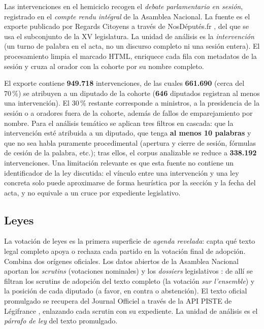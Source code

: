 Las intervenciones en el hemiciclo recogen el \emph{debate parlamentario en
sesión}, registrado en el \emph{compte rendu intégral} de la Asamblea Nacional.
La fuente es el exporte publicado por Regards Citoyens a través de NosDéputés.fr
\cite{regardscitoyens_nosdeputes}, del que se usa el subconjunto de la XV
legislatura. La unidad de análisis es la \emph{intervención} (un turno de
palabra en el acta, no un discurso completo ni una sesión entera). El
procesamiento limpia el marcado HTML, enriquece cada fila con metadatos de la
sesión y cruza al orador con la cohorte por su nombre completo.

El exporte contiene \textbf{949.718} intervenciones, de las cuales
\textbf{661.690} (cerca del $70\,\%$) se atribuyen a un diputado de la cohorte
(\textbf{646} diputados registran al menos una intervención). El $30\,\%$
restante corresponde a ministros, a la presidencia de la sesión o a oradores
fuera de la cohorte, además de fallos de emparejamiento por nombre. Para el
análisis temático se aplican tres filtros en cascada: que la intervención esté
atribuida a un diputado, que tenga \textbf{al menos 10 palabras} y que no sea
habla puramente procedimental (apertura y cierre de sesión, fórmulas de cesión de
la palabra, etc.); tras ellos, el corpus analizable se reduce a \textbf{338.192}
intervenciones. Una limitación relevante es que esta fuente no contiene un
identificador de la ley discutida: el vínculo entre una intervención y una ley
concreta solo puede aproximarse de forma heurística por la sección y la fecha del
acta, y no equivale a un cruce por expediente legislativo.

\subsection{Leyes}
\label{sec:corpus-leyes}

La votación de leyes es la primera superficie de \emph{agenda revelada}: capta
qué texto legal completo apoya o rechaza cada partido en la votación final de
adopción. Combina dos orígenes oficiales. Los datos abiertos de la Asamblea
Nacional aportan los \emph{scrutins} (votaciones nominales) y los \emph{dossiers}
legislativos \cite{an_opendata_xv}: de allí se filtran los scrutins de adopción
del texto completo (la votación \emph{sur l'ensemble}) y la posición de cada
diputado (a favor, en contra o abstención). El texto oficial promulgado se
recupera del Journal Officiel a través de la API PISTE de Légifrance
\cite{legifrance_piste}, enlazando cada scrutin con su expediente. La unidad de
análisis es el \emph{párrafo de ley} del texto promulgado.

